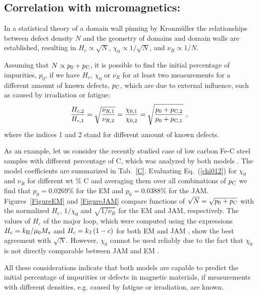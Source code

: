 \documentclass[../main.tex]{subfiles}
\begin{document}
\subsection{Correlation with micromagnetics:}

In a statistical theory of a domain wall pinning by Kronm\"uller \cite{Kron} the relationships between defect density $N$ and the geometry of domains and domain walls are established, resulting in $H_c\propto \sqrt{N}$, $\chi_0\propto 1/\sqrt{N}$, and $\nu_R\propto 1/N$.

Assuming that $N\propto p_0+p_{\rm C}$, it is possible to find the initial percentage of impurities, $p_0$, if we have $H_c$, $\chi_0$ or $\nu_R$ for at least two measurements for a different amount of known defects, $p_{\rm C}$, which are due to external influence, such as caused by irradiation or fatigue:
\begin{equation}
  \frac{H_{c,2}}{H_{c,1}} =
  \sqrt{\frac{\nu_{R,1}}{\nu_{R,2}}} =
  \frac{\chi_{0,1}}{\chi_{0,2}} =
  \sqrt{\frac{p_0+p_{\rm C,2}}{p_0+p_{\rm C,1}}} \ ,
  \label{chi012}
\end{equation}
where the indices 1 and 2 stand for different amount of known defects.

As an example, let us consider the recently studied case of low carbon Fe-C steel samples with different percentage of C, which was analyzed by both models \cite{TMAG}. The model coefficients are summarized in Tab.~\ref{C}. Evaluating Eq.~(\ref{chi012}) for $\chi_0$ and $\nu_R$ for different wt \% C and averaging them over all combinations of $p_{\rm C}$ we find that $p_0=0.0269\%$ for the EM and $p_0=0.0388\%$ for the JAM. Figures~\ref{FigureEM} and \ref{FigureJAM} compare functions of $\sqrt{N}=\sqrt{p_0+p_{\rm C}}$ with the normalized $H_c$, $1/\chi_0$ and $\sqrt{1/\nu_R}$ for the EM and JAM, respectively. The values of $H_c$ of the major loop, which were computed using the expressions
$H_c=k_{\rm H}/\mu_0 M_s$ and $H_c=k_{\rm J}\,(1-c)$
for both EM and JAM \cite{TMAG}, show the best agreement with $\sqrt{N}$. However, $\chi_0$ cannot be used reliably due to the fact that $\chi_0$ is not directly comparable between JAM and EM \cite{TMAG}.

All these considerations indicate that both models are capable to predict the initial percentage of impurities or defects in magnetic materials, if measurements with different densities, e.g. caused by fatigue or irradiation, are known.

\cleardoublepage
\end{document}
